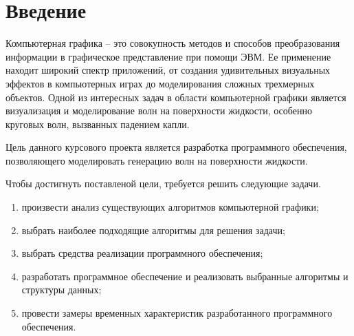 \chapter*{Введение}

Компьютерная графика -- это совокупность методов и способов 
преобразования информации в графическое представление при помощи ЭВМ. 
Ее применение находит широкий спектр приложений, от создания удивительных визуальных эффектов в 
компьютерных играх до моделирования сложных трехмерных объектов. 
Одной из интересных задач в области компьютерной графики является визуализация и 
моделирование волн на поверхности жидкости, особенно круговых волн, вызванных падением капли.

Цель данного курсового проекта является разработка программного обеспечения, позволяющего моделировать 
генерацию волн на поверхности жидкости.

Чтобы достигнуть поставленой цели, требуется решить следующие задачи.

\begin{enumerate}[label=---]
    \item произвести анализ существующих алгоритмов компьютерной графики;
    \item выбрать наиболее подходящие алгоритмы для решения задачи;
    \item выбрать средства реализации программного обеспечения;
    \item разработать программное обеспечение и реализовать выбранные алгоритмы и структуры данных;
    \item провести замеры временных характеристик разработанного программного обеспечения.
\end{enumerate}
